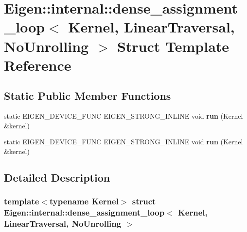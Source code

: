 \hypertarget{struct_eigen_1_1internal_1_1dense__assignment__loop_3_01_kernel_00_01_linear_traversal_00_01_no_unrolling_01_4}{}\section{Eigen\+:\+:internal\+:\+:dense\+\_\+assignment\+\_\+loop$<$ Kernel, Linear\+Traversal, No\+Unrolling $>$ Struct Template Reference}
\label{struct_eigen_1_1internal_1_1dense__assignment__loop_3_01_kernel_00_01_linear_traversal_00_01_no_unrolling_01_4}
\subsection*{Static Public Member Functions}
\begin{DoxyCompactItemize}
\item 
\mbox{\label{struct_eigen_1_1internal_1_1dense__assignment__loop_3_01_kernel_00_01_linear_traversal_00_01_no_unrolling_01_4_a8853bcf4c1f929744b93becdf42e1484}} 
static E\+I\+G\+E\+N\+\_\+\+D\+E\+V\+I\+C\+E\+\_\+\+F\+U\+NC E\+I\+G\+E\+N\+\_\+\+S\+T\+R\+O\+N\+G\+\_\+\+I\+N\+L\+I\+NE void {\bfseries run} (Kernel \&kernel)
\item 
\mbox{\label{struct_eigen_1_1internal_1_1dense__assignment__loop_3_01_kernel_00_01_linear_traversal_00_01_no_unrolling_01_4_a8853bcf4c1f929744b93becdf42e1484}} 
static E\+I\+G\+E\+N\+\_\+\+D\+E\+V\+I\+C\+E\+\_\+\+F\+U\+NC E\+I\+G\+E\+N\+\_\+\+S\+T\+R\+O\+N\+G\+\_\+\+I\+N\+L\+I\+NE void {\bfseries run} (Kernel \&kernel)
\end{DoxyCompactItemize}


\subsection{Detailed Description}
\subsubsection*{template$<$typename Kernel$>$\newline
struct Eigen\+::internal\+::dense\+\_\+assignment\+\_\+loop$<$ Kernel, Linear\+Traversal, No\+Unrolling $>$}



